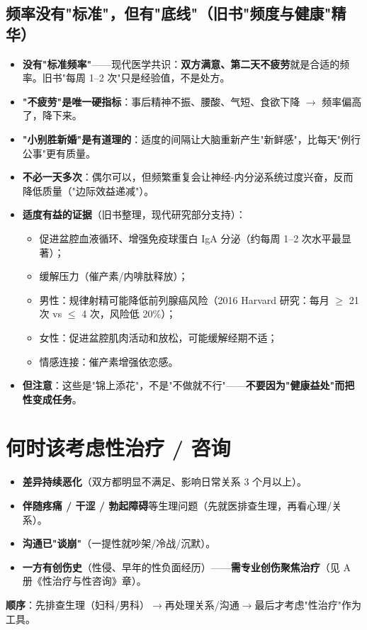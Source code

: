 \documentclass[12pt,UTF8,openany]{ctexbook}
\begin{document}
\subsection*{频率没有"标准"，但有"底线"（旧书"频度与健康"精华）}

\begin{itemize}[leftmargin=2em,itemsep=0.3em]
  \item \textbf{没有"标准频率"}——现代医学共识：\textbf{双方满意、第二天不疲劳}就是合适的频率。旧书"每周 1--2 次"只是经验值，不是处方。
  \item \textbf{"不疲劳"是唯一硬指标}：事后精神不振、腰酸、气短、食欲下降 $\to$ 频率偏高了，降下来。
  \item \textbf{"小别胜新婚"是有道理的}：适度的间隔让大脑重新产生"新鲜感"，比每天"例行公事"更有质量。
  \item \textbf{不必一天多次}：偶尔可以，但频繁重复会让神经-内分泌系统过度兴奋，反而降低质量（"边际效益递减"）。
  \item \textbf{适度有益的证据}（旧书整理，现代研究部分支持）：
    \begin{itemize}[leftmargin=2em,itemsep=0.2em]
      \item 促进盆腔血液循环、增强免疫球蛋白 IgA 分泌（约每周 1--2 次水平最显著）；
      \item 缓解压力（催产素/内啡肽释放）；
      \item 男性：规律射精可能降低前列腺癌风险（2016 Harvard 研究：每月 $\geq$ 21 次 vs $\leq$ 4 次，风险低 20\%）；
      \item 女性：促进盆腔肌肉活动和放松，可能缓解经期不适；
      \item 情感连接：催产素增强依恋感。
    \end{itemize}
  \item \textbf{但注意}：这些是"锦上添花"，不是"不做就不行"——\textbf{不要因为"健康益处"而把性变成任务}。
\end{itemize}

\section{何时该考虑性治疗 / 咨询}
\begin{itemize}[leftmargin=2em,itemsep=0.3em]
  \item \textbf{差异持续恶化}（双方都明显不满足、影响日常关系 3 个月以上）。
  \item \textbf{伴随疼痛 / 干涩 / 勃起障碍}等生理问题（先就医排查生理，再看心理/关系）。
  \item \textbf{沟通已"谈崩"}（一提性就吵架/冷战/沉默）。
  \item \textbf{一方有创伤史}（性侵、早年的性负面经历）——\textbf{需专业创伤聚焦治疗}（见 A 册《性治疗与性咨询》章）。
\end{itemize}
\textbf{顺序}：先排查生理（妇科/男科）$\to$再处理关系/沟通$\to$最后才考虑"性治疗"作为工具。
\end{document}
